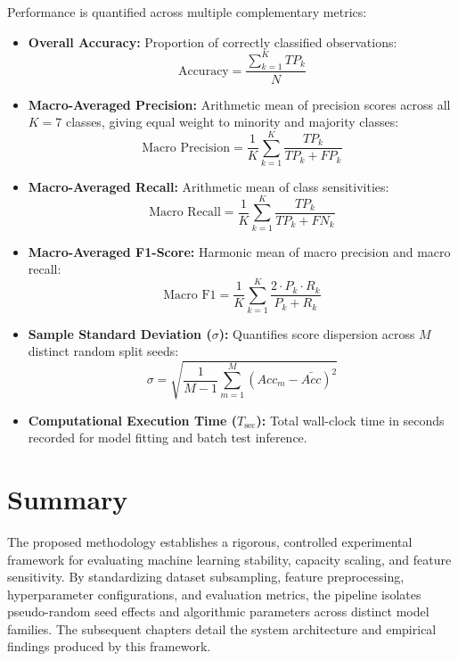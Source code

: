 Performance is quantified across multiple complementary metrics:
\begin{itemize}
    \item \textbf{Overall Accuracy:} Proportion of correctly classified observations:
    \begin{equation}
        \text{Accuracy} = \frac{\sum_{k=1}^K TP_k}{N}
    \end{equation}
    \item \textbf{Macro-Averaged Precision:} Arithmetic mean of precision scores across all $K=7$ classes, giving equal weight to minority and majority classes:
    \begin{equation}
        \text{Macro Precision} = \frac{1}{K} \sum_{k=1}^K \frac{TP_k}{TP_k + FP_k}
    \end{equation}
    \item \textbf{Macro-Averaged Recall:} Arithmetic mean of class sensitivities:
    \begin{equation}
        \text{Macro Recall} = \frac{1}{K} \sum_{k=1}^K \frac{TP_k}{TP_k + FN_k}
    \end{equation}
    \item \textbf{Macro-Averaged F1-Score:} Harmonic mean of macro precision and macro recall:
    \begin{equation}
        \text{Macro F1} = \frac{1}{K} \sum_{k=1}^K \frac{2 \cdot P_k \cdot R_k}{P_k + R_k}
    \end{equation}
    \item \textbf{Sample Standard Deviation ($\sigma$):} Quantifies score dispersion across $M$ distinct random split seeds:
    \begin{equation}
        \sigma = \sqrt{\frac{1}{M-1} \sum_{m=1}^M (Acc_m - \bar{Acc})^2}
    \end{equation}
    \item \textbf{Computational Execution Time ($T_{\text{sec}}$):} Total wall-clock time in seconds recorded for model fitting and batch test inference.
\end{itemize}

\section{Summary}
\label{sec:method_summary}

The proposed methodology establishes a rigorous, controlled experimental framework for evaluating machine learning stability, capacity scaling, and feature sensitivity. By standardizing dataset subsampling, feature preprocessing, hyperparameter configurations, and evaluation metrics, the pipeline isolates pseudo-random seed effects and algorithmic parameters across distinct model families. The subsequent chapters detail the system architecture and empirical findings produced by this framework.
